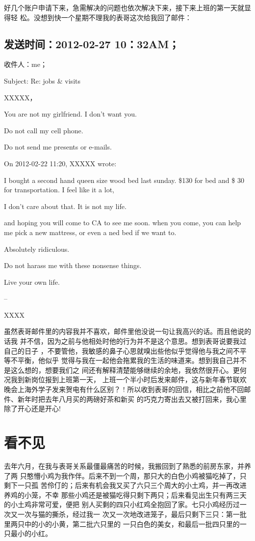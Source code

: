 \documentclass[12pt]{book}
\begin{document}
好几个账户申请下来，急需解决的问题也依次解决下来，接下来上班的第一天就显得轻
松。没想到快一个星期不理我的表哥这次给我回了邮件：

\subsection{发送时间：2012-02-27 10：32AM；}
\label{sec-9-49-1}
收件人：me；

Subject: Re: jobs \& visits

XXXXX，

You are not my girlfriend.  I don't want you.

Do not call my cell phone.

Do not send me presents or e-mails.

On 2012-02-22 11:20, XXXXX wrote:

I bought a second hand queen size wood bed last sunday.  \$130 for bed and \$
30 for transportation. I feel like it a lot, 

I don't care about that.  It is not my life.

and hoping you will come to CA to see me soon. when you come, you can help 
me pick a new mattress, or even a ned bed if we want to. 

Absolutely ridiculous.

Do not harass me with these nonsense things.

Live your own life.

--

XXXX

虽然表哥邮件里的内容我并不喜欢，邮件里他没说一句让我高兴的话。而且他说的话我
并不信，因为之前与他相处时他的行为并不是这个意思。想到表哥说要我过自己的日子
，不要管他，我敏感的鼻子心思就嗅出些他似乎觉得他与我之间不平等不平衡，他似乎
觉得与我在一起他会拖累我的生活的味道来。想到我自己并不是这么想的，想要我们之
间还有解释清楚能够继续的余地，我依然很开心。更何况我到新岗位报到上班第一天，
上班一个半小时后发来邮件，这与新年春节联欢晚会上海外学子发来贺电有什么区别？
! 所以收到表哥的回信，相比之前他不回邮件、新年时把去年八月买的两磅好茶和新买
的巧克力寄出去又被打回来，我心里除了开心还是开心!
\section{看不见}
\label{sec-9-50}

去年六月，在我与表哥关系最僵最痛苦的时候，我搬回到了熟悉的前房东家，并养了两
只憨懵小鸡为我作伴。后来不到一个周，那只大的白色小鸡被猫吃掉了，只剩下一只孤
苦伶仃的；后来有机会我又买了六只三个周大的小土鸡，并一再改进养鸡的小笼，不幸
那些小鸡还是被猫吃得只剩下两只；后来看见出生只有两三天的小土鸡非常可爱，便把
别人买剩的四只小红鸡全抱回了家。七只小鸡经历过一次又一次与猫的撕杀，经过我一
次又一次地改进笼子，最后只剩下三只：第一批里两只中的小的小黄，第二批六只里的
一只白色的美女，和最后一批四只里的一只最小的小红。
\end{document}
